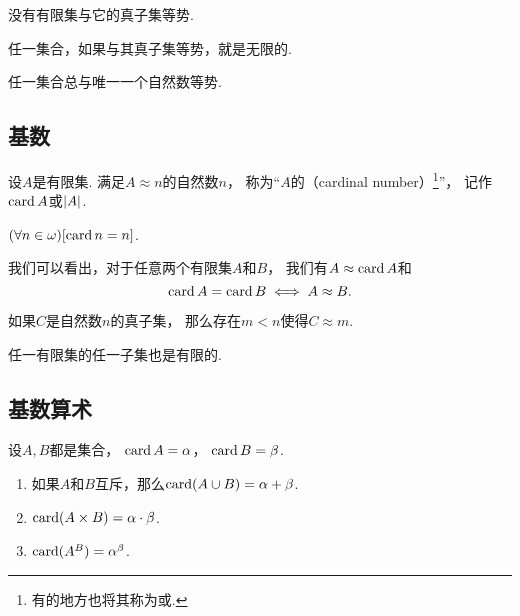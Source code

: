 \begin{corollary}
没有有限集与它的真子集等势.
\end{corollary}

\begin{corollary}
任一集合，如果与其真子集等势，就是无限的.
\end{corollary}

\begin{corollary}
任一集合总与唯一一个自然数等势.
\end{corollary}

\subsection{基数}
\begin{definition}
设\(A\)是有限集.
满足\(A \approx n\)的自然数\(n\)，
称为“\(A\)的（cardinal number）\footnote{%
有的地方也将其称为或.
}”，
记作\(\operatorname{card} A\)或\(\abs{A}\).
\end{definition}

\begin{example}
\((\forall n\in\omega)[\operatorname{card} n = n]\).
\end{example}

我们可以看出，对于任意两个有限集\(A\)和\(B\)，
我们有\(A \approx \operatorname{card} A\)和\[
	\operatorname{card} A = \operatorname{card} B
	\iff
	A \approx B.
\]


\begin{lemma}
如果\(C\)是自然数\(n\)的真子集，
那么存在\(m<n\)使得\(C \approx m\).
\end{lemma}

\begin{theorem}
任一有限集的任一子集也是有限的.
\end{theorem}

\subsection{基数算术}
\begin{definition}
设\(A,B\)都是集合，
\(\operatorname{card} A = \alpha\)，
\(\operatorname{card} B = \beta\).
\begin{enumerate}
	\item 如果\(A\)和\(B\)互斥，那么\(\operatorname{card}(A \cup B)=\alpha+\beta\).
	\item \(\operatorname{card}(A \times B)=\alpha\cdot\beta\).
	\item \(\operatorname{card}(A^B)=\alpha^\beta\).
\end{enumerate}
\end{definition}

